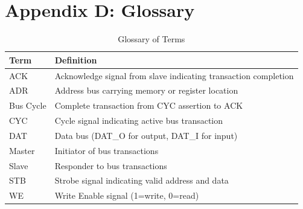\documentclass[12pt,a4paper]{article}
\begin{document}
\section{Appendix D: Glossary}

\begin{table}[H]
    \centering
    \begin{tabular}{|p{3cm}|p{7cm}|}
        \hline
        \textbf{Term} & \textbf{Definition} \\
        \hline
        ACK & Acknowledge signal from slave indicating transaction completion \\
        ADR & Address bus carrying memory or register location \\
        Bus Cycle & Complete transaction from CYC assertion to ACK \\
        CYC & Cycle signal indicating active bus transaction \\
        DAT & Data bus (DAT\_O for output, DAT\_I for input) \\
        Master & Initiator of bus transactions \\
        Slave & Responder to bus transactions \\
        STB & Strobe signal indicating valid address and data \\
        WE & Write Enable signal (1=write, 0=read) \\
        \hline
    \end{tabular}
    \caption{Glossary of Terms}
\end{table}

\end{document}
